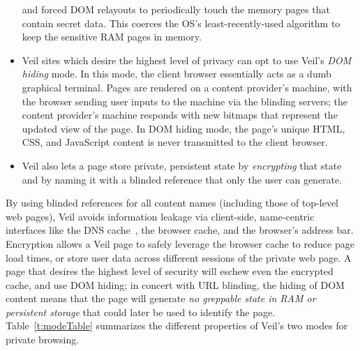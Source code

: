 \begin{itemize}
          and forced DOM relayouts to periodically touch the
          memory pages that contain secret data. This coerces
          the OS's least-recently-used algorithm to keep the
          sensitive RAM pages in memory.
    \item Veil sites which desire the highest level of privacy can
          opt to use Veil's \emph{DOM hiding} mode. In this
          mode, the client browser essentially acts as a dumb
          graphical terminal. Pages are rendered on a content
          provider's machine, with the browser sending user inputs
          to the machine via the blinding servers; the content
          provider's machine responds with new bitmaps that
          represent the updated view of the page. In DOM hiding
          mode, the page's unique HTML, CSS, and JavaScript content
          is never transmitted to the client browser.
    \item Veil also lets a page store private, persistent
          state by \emph{encrypting} that state and by naming
          it with a blinded reference that only the user can
          generate.
  \end{itemize}
By using blinded references for all content names (including
those of top-level web pages), Veil avoids information leakage
via client-side, name-centric interfaces like the
DNS cache~\cite{timingAttacks}, the browser cache, and
the browser's address bar.
Encryption allows a Veil page to safely leverage the
browser cache to reduce page load times, or store user data
across different sessions of the private web page. A page
that desires the highest level of security will eschew even
the encrypted cache, and use DOM hiding; in concert with URL
blinding, the hiding of DOM content means that the page will
generate \emph{no greppable state in RAM or persistent storage}
that could later be used to identify the page. Table~\ref{t:modeTable}
summarizes the different properties of Veil's two modes for
private browsing.

